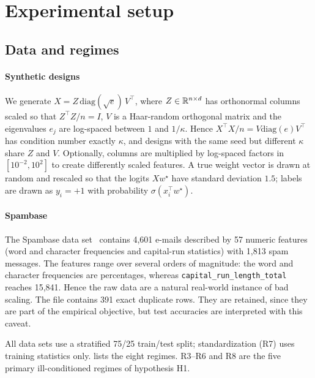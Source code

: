 \section{Experimental setup}\label{sec:setup}

\subsection{Data and regimes}
\paragraph{Synthetic designs} We generate $X=Z\,\mathrm{diag}(\sqrt{e})\,V^\top$,
where $Z\in\mathbb{R}^{n\times d}$ has orthonormal columns scaled so that $Z^\top Z/n=I$,
$V$ is a Haar-random orthogonal matrix and the eigenvalues $e_j$ are log-spaced
between $1$ and $1/\kappa$. Hence $X^\top X/n=V\mathrm{diag}(e)V^\top$ has condition
number exactly $\kappa$, and designs with the same seed but different $\kappa$ share
$Z$ and $V$. Optionally, columns are multiplied by log-spaced factors in
$[10^{-2},10^{2}]$ to create differently scaled features. A true weight vector is
drawn at random and rescaled so that the logits $Xw^\star$ have standard deviation
$1.5$; labels are drawn as $y_i=+1$ with probability $\sigma(x_i^\top w^\star)$.

\paragraph{Spambase} The Spambase data set~\cite{spambase} contains 4,601 e-mails
described by 57 numeric features (word and character frequencies and capital-run
statistics) with 1,813 spam messages. The features range over several orders of
magnitude: the word and character frequencies are percentages, whereas
\texttt{capital\_run\_length\_total} reaches 15,841. Hence the raw data are a natural real-world instance of bad
scaling. The file contains 391 exact duplicate rows. They are retained, since they
are part of the empirical objective, but test accuracies are interpreted with this
caveat.

All data sets use a stratified 75/25 train/test split; standardization (R7) uses
training statistics only.  lists the eight regimes. R3--R6 and R8
are the five primary ill-conditioned regimes of hypothesis H1.

\begin{table}[t]
\centering
\caption{Regimes of the study. $\kappa$ is the condition number of $X^\top X/n$
(synthetic) and $\kappa(H_0)$ the median condition number of the Hessian at $w_0=0$
over the ten seeds (training data).}\label{tab:regimes}
\small

\end{table}

